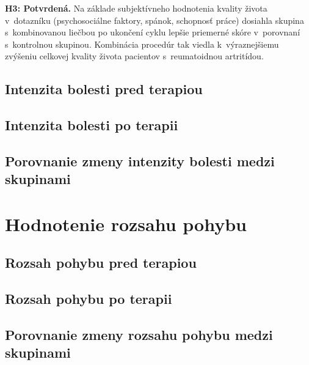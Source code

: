 \textbf{H3: Potvrdená.} Na základe subjektívneho hodnotenia kvality života v~dotazníku (psychosociálne faktory, spánok, schopnosť práce) dosiahla skupina s~kombinovanou liečbou po ukončení cyklu lepšie priemerné skóre v~porovnaní s~kontrolnou skupinou. Kombinácia procedúr tak viedla k~výraznejšiemu zvýšeniu celkovej kvality života pacientov s~reumatoidnou artritídou.
\subsection{Intenzita bolesti pred terapiou}


\subsection{Intenzita bolesti po terapii}


\subsection{Porovnanie zmeny intenzity bolesti medzi skupinami}


\section{Hodnotenie rozsahu pohybu}


\subsection{Rozsah pohybu pred terapiou}


\subsection{Rozsah pohybu po terapii}


\subsection{Porovnanie zmeny rozsahu pohybu medzi skupinami}


